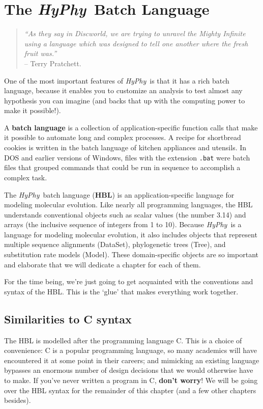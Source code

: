 \documentclass[12pt,twoside,openright]{book}
\newcommand{\hyphy}{\textit{HyPhy}}
\begin{document}
\chapter {The \hyphy\ Batch Language}

\begin{quote}
\textit{``As they say in Discworld, we are trying to unravel the Mighty Infinite using a language which was designed to tell one another where the fresh fruit was.''}\\ -- Terry Pratchett.
\end{quote}

\vspace{0.5in}

One of the most important features of \hyphy\ is that it has a rich batch language, because it enables you to customize an analysis to test almost any hypothesis you can imagine (and backs that up with the computing power to make it possible!).  

A \textbf{batch language} is a collection of application-specific function calls that make it possible to automate long and complex processes.  A recipe for shortbread cookies is written in the batch language of kitchen appliances and utensils.  In DOS and earlier versions of Windows, files with the extension {\tt .bat} were batch files that grouped commands that could be run in sequence to accomplish a complex task.  

 The \hyphy\ batch language (\textbf{HBL}) is an application-specific language for modeling molecular evolution.  Like nearly all programming languages, the HBL understands conventional objects such as scalar values (the number 3.14) and arrays (the inclusive sequence of integers from 1 to 10).  Because \hyphy\ is a language for modeling molecular evolution, it also includes objects that represent multiple sequence alignments (DataSet), phylogenetic trees (Tree), and substitution rate models (Model).  These domain-specific objects are so important and elaborate that we will dedicate a chapter for each of them. 

 For the time being, we're just going to get acquainted with the conventions and syntax of the HBL.  This is the `glue' that makes everything work together.


\section {Similarities to C syntax}

The HBL is modelled after the programming language C.  This is a choice of convenience: C is a popular programming language, so many academics will have encountered it at some point in their careers; and mimicking an existing language bypasses an enormous number of design decisions that we would otherwise have to make.  If you've never written a program in C, \textbf{don't worry}!  We will be going over the HBL syntax for the remainder of this chapter (and a few other chapters besides).  
\end{document}
